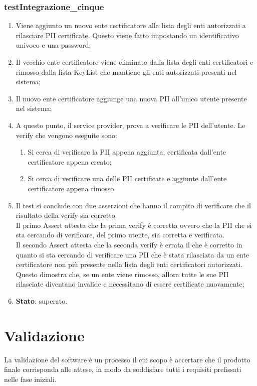\subsubsection{testIntegrazione\_cinque}
\begin{enumerate}
	\item Viene aggiunto un nuovo ente certificatore alla lista degli enti autorizzati a rilasciare \gls{PII} certificate. Questo viene fatto impostando un identificativo univoco e una password;
	\item Il vecchio ente certificatore viene eliminato dalla lista degli enti certificatori e rimosso dalla lista KeyList che mantiene gli enti autorizzati presenti nel sistema;
	\item Il nuovo ente certificatore aggiunge una nuova \gls{PII} all'unico utente presente nel sistema;
	\item A questo punto, il service provider, prova a verificare le \gls{PII} dell'utente. Le verify che vengono eseguite sono:
	\begin{enumerate}
		\item Si cerca di verificare la \gls{PII} appena aggiunta, certificata dall'ente certificatore appena creato;
		\item Si cerca di verificare una delle \gls{PII} certificate e aggiunte dall'ente certificatore appena rimosso.
	\end{enumerate}
	\item Il test si conclude con due asserzioni che hanno il compito di verificare che il risultato della verify sia corretto.\\
	Il primo Assert attesta che la prima verify è corretta ovvero che la \gls{PII} che si sta cercando di verificare, del primo utente, sia corretta e verificata.\\
	Il secondo Assert attesta che la seconda verify è errata il che è corretto in quanto si sta cercando di verificare una \gls{PII} che è stata rilasciata da un ente certificatore non più presente nella lista degli enti certificatori autorizzati.\\
	Questo dimostra che, se un ente viene rimosso, allora tutte le sue \gls{PII} rilasciate diventano invalide e necessitano di essere certificate nuovamente;	
	\item \textbf{Stato}: superato.
\end{enumerate}
\section{Validazione}
La validazione del software è un processo il cui scopo è accertare che il prodotto finale corrisponda alle attese, in modo da soddisfare tutti i requisiti prefissati nelle fase iniziali.
